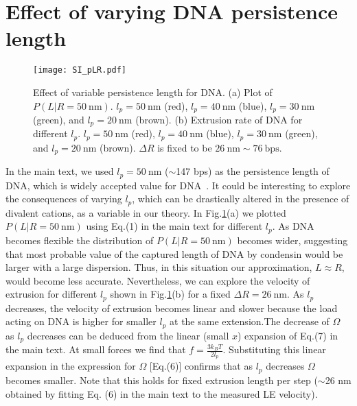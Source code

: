 \documentclass[aps,preprint]{revtex4-1}
\newcommand{\nm}{\ \mathrm{nm}}
\newcommand{\bps}{\ \mathrm{bps}}
\newcommand{\vR}{R}
\newcommand{\vL}{L}
\newcommand{\DR}{\Delta R}
\begin{document}
\section{Effect of varying DNA persistence length}
\begin{figure}[]
\centering
\texttt{[image: SI\_pLR.pdf]}
\caption{\label{fig:rate_lp}Effect of variable persistence length for DNA. (a) Plot of $P(\vL|R=50\nm)$. $l_p=50\nm$ (red), $l_p=40\nm$ (blue), $l_p=30\nm$ (green), and $l_p=20\nm$ (brown). (b) Extrusion rate of DNA for different $l_p$. $l_p=50\nm$ (red), $l_p=40\nm$ (blue), $l_p=30\nm$ (green), and $l_p=20\nm$ (brown). $\DR$ is fixed to be $26\nm \sim 76\bps$. 
}
\end{figure}


In the main text, we used $l_p=50 \nm$ ($\sim$147 bps) as the persistence length of DNA, which is widely accepted value for DNA~\cite{rubinstein2003polymer}.
It could be interesting to explore the consequences of varying $l_p$, which can be drastically altered in the presence of divalent cations, as a variable in our theory. In Fig.\ref{fig:rate_lp}(a) we plotted $P(\vL|R=50\nm)$ using Eq.(1) in the main text for different $l_p$. As DNA becomes flexible the distribution of $P(\vL|R=50\nm)$ becomes wider, suggesting that most probable value of the captured length of DNA by condensin would be larger with a large dispersion. Thus, in this situation our approximation, $\vL \approx \vR$, would become less accurate. Nevertheless, we can explore the velocity of extrusion for different $l_p$ shown in Fig.\ref{fig:rate_lp}(b) for a fixed $\DR=26\nm$. As $l_p$ decreases, the velocity of extrusion becomes linear and slower because the load acting on DNA is higher for smaller $l_p$ at the same extension.The decrease of $\Omega$ as $l_p$ decreases can be deduced from the linear (small $x$) expansion of Eq.(7) in the main text. At small forces we find that  $f=\frac{3k_BT}{2 l_p}$. Substituting this linear expansion in the expression for $\Omega$ [Eq.(6)] confirms that as $l_p$ decreases $\Omega$ becomes smaller. Note  that this holds  for fixed extrusion length per step ($\sim$26 nm obtained by fitting Eq. (6) in the main text to the measured  LE velocity).  
\end{document}

